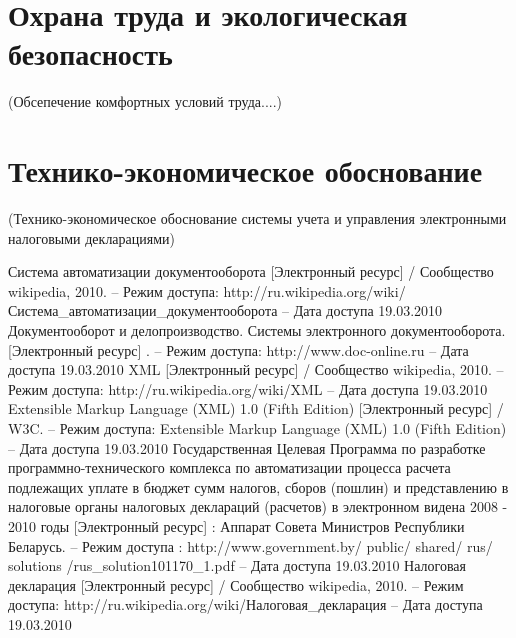 \documentclass[14pt,a4paper]{reportmod}
\begin{document}
\chapter*{Охрана труда и экологическая безопасность}
(Обсепечение комфортных условий труда....)


\chapter*{Технико-экономическое обоснование}
(Технико-экономическое обоснование системы учета и управления электронными налоговыми декларациями)


\begin{thebibliography}{99}

 Система автоматизации документооборота [Электронный ресурс] / Сообщество wikipedia, 2010. -- Режим доступа: http://ru.wikipedia.org/wiki/Система\_автоматизации\_документооборота -- Дата доступа 19.03.2010
 Документооборот и делопроизводство. Системы электронного документооборота. [Электронный ресурс] . -- Режим доступа: http://www.doc-online.ru -- Дата доступа 19.03.2010
 XML [Электронный ресурс] / Сообщество wikipedia, 2010. -- Режим доступа: http://ru.wikipedia.org/wiki/XML -- Дата доступа 19.03.2010
 Extensible Markup Language (XML) 1.0 (Fifth Edition) [Электронный ресурс] / W3C. -- Режим доступа: Extensible Markup Language (XML) 1.0 (Fifth Edition) -- Дата доступа 19.03.2010
 Государственная Целевая Программа по разработке программно-технического комплекса по автоматизации процесса расчета подлежащих уплате в бюджет сумм налогов, сборов (пошлин) и представлению в налоговые органы налоговых деклараций (расчетов) в электронном видена 2008 - 2010 годы [Электронный ресурс] : Аппарат Совета Министров Республики Беларусь. -- Режим доступа : http://www.government.by/ public/ shared/ rus/ solutions /rus\_solution101170\_1.pdf -- Дата доступа 19.03.2010
 Налоговая декларация [Электронный ресурс] / Сообщество wikipedia, 2010. -- Режим доступа: http://ru.wikipedia.org/wiki/Налоговая\_декларация -- Дата доступа 19.03.2010

\end{thebibliography}
\end{document}
